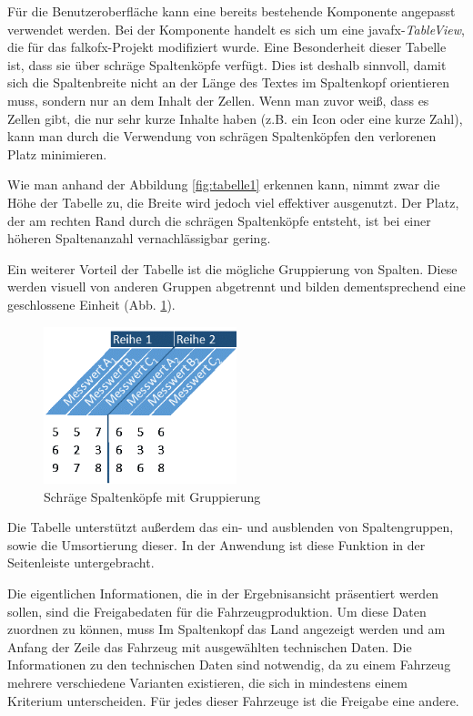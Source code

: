 Für die Benutzeroberfläche kann eine bereits bestehende Komponente angepasst verwendet werden. Bei der Komponente handelt es sich um eine \gls{javafx}-\textit{TableView}, die für das \gls{falkofx}-Projekt modifiziert wurde. Eine Besonderheit dieser Tabelle ist, dass sie über schräge Spaltenköpfe verfügt. Dies ist deshalb sinnvoll, damit sich die Spaltenbreite nicht an der Länge des Textes im Spaltenkopf orientieren muss, sondern nur an dem Inhalt der Zellen. Wenn man zuvor weiß, dass es Zellen gibt, die nur sehr kurze Inhalte haben (z.B. ein Icon oder eine kurze Zahl), kann man durch die Verwendung von schrägen Spaltenköpfen den verlorenen Platz minimieren.

Wie man anhand der Abbildung \ref{fig:tabelle1} erkennen kann, nimmt zwar die Höhe der Tabelle zu, die Breite wird jedoch viel effektiver ausgenutzt. Der Platz, der am rechten Rand durch die schrägen Spaltenköpfe entsteht, ist bei einer höheren Spaltenanzahl vernachlässigbar gering.

Ein weiterer Vorteil der Tabelle ist die mögliche Gruppierung von Spalten. Diese werden visuell von anderen Gruppen abgetrennt und bilden dementsprechend eine geschlossene Einheit (Abb. \ref{fig:tabelle2}).

\begin{figure}[H]
 \centering
 \includegraphics[width=0.5\textwidth]{grafiken/Tabelle_Grouped.png}
 \caption{Schräge Spaltenköpfe mit Gruppierung}
 \label{fig:tabelle2}
\end{figure}

Die Tabelle unterstützt außerdem das ein- und ausblenden von Spaltengruppen, sowie die Umsortierung dieser. In der Anwendung ist diese Funktion in der Seitenleiste untergebracht.

Die eigentlichen Informationen, die in der Ergebnisansicht präsentiert werden sollen, sind die Freigabedaten für die Fahrzeugproduktion. Um diese Daten zuordnen zu können, muss Im Spaltenkopf das Land angezeigt werden und am Anfang der Zeile das Fahrzeug mit ausgewählten technischen Daten. Die Informationen zu den technischen Daten sind notwendig, da zu einem Fahrzeug mehrere verschiedene Varianten existieren, die sich in mindestens einem Kriterium unterscheiden. Für jedes dieser Fahrzeuge ist die Freigabe eine andere. 

